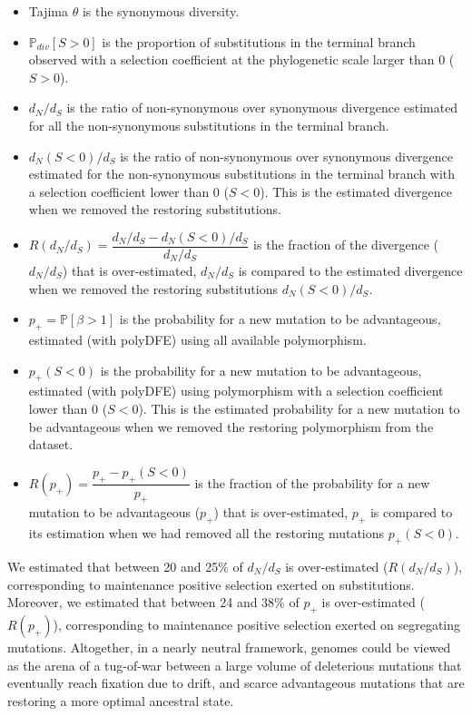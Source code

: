 \documentclass{article}
\newcommand{\proba}{\mathbb{P}}
\newcommand{\dn}{d_N}
\newcommand{\ds}{d_S}
\newcommand{\dnds}{\dn / \ds}
\newcommand{\Sphy}{S}
\newcommand{\Spop}{\beta}
\newcommand{\polyAdv}{ \Spop > 1}
\newcommand{\PpolyAdv}{\proba \left[ \polyAdv \right]}
\begin{document}
    \begin{itemize}
        \item Tajima $\theta$ is the synonymous diversity.
        \item $\mathbb{P}_{div}[\Sphy > 0]$ is the proportion of substitutions in the terminal branch observed with a selection coefficient at the phylogenetic scale larger than 0 ($\Sphy > 0$).
        \item $\dnds$ is the ratio of non-synonymous over synonymous divergence estimated for all the non-synonymous substitutions in the terminal branch.
        \item $\dn(\Sphy < 0) / \ds$ is the ratio of non-synonymous over synonymous divergence estimated for the non-synonymous substitutions in the terminal branch with a selection coefficient lower than 0 ($\Sphy < 0$).
        This is the estimated divergence when we removed the restoring substitutions.
        \item $R(\dnds)=\dfrac{\dnds - \dn(\Sphy < 0) / \ds}{\dnds}$ is the fraction of the divergence ($\dnds$) that is over-estimated, $\dnds$ is compared to the estimated divergence when we removed the restoring substitutions $\dn(\Sphy < 0) / \ds$.
        \item $p_+=\PpolyAdv$ is the probability for a new mutation to be advantageous, estimated (with polyDFE) using all available polymorphism.
        \item $p_+(\Sphy < 0)$ is the probability for a new mutation to be advantageous, estimated (with polyDFE) using polymorphism with a selection coefficient lower than 0 ($\Sphy < 0$).
        This is the estimated probability for a new mutation to be advantageous when we removed the restoring polymorphism from the dataset.
        \item $R(p_+)=\dfrac{p_+ - p_+(\Sphy < 0)}{p_+}$ is the fraction of the probability for a new mutation to be advantageous ($p_+$) that is over-estimated, $p_+$ is compared to its estimation when we had removed all the restoring mutations $p_+(\Sphy < 0)$.
    \end{itemize}

    We estimated that between 20 and 25\% of $\dnds$ is over-estimated ($R(\dnds)$), corresponding to maintenance positive selection exerted on substitutions.
    Moreover, we estimated that between 24 and 38\% of $p_+$ is over-estimated ($R(p_+)$), corresponding to maintenance positive selection exerted on segregating mutations.
    Altogether, in a nearly neutral framework, genomes could be viewed as the arena of a tug-of-war between a large volume of deleterious mutations that eventually reach fixation due to drift, and scarce advantageous mutations that are restoring a more optimal ancestral state.
\end{document}
